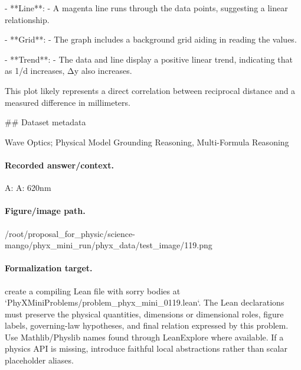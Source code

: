 - **Line**:
  - A magenta line runs through the data points, suggesting a linear relationship.
  
- **Grid**:
  - The graph includes a background grid aiding in reading the values.

- **Trend**:
  - The data and line display a positive linear trend, indicating that as 1/d increases, Δy also increases.

This plot likely represents a direct correlation between reciprocal distance and a measured difference in millimeters.

\#\# Dataset metadata

Wave Optics; Physical Model Grounding Reasoning, Multi-Formula Reasoning

\paragraph{Recorded answer/context.}
A: A: 620nm

\paragraph{Figure/image path.}
/root/proposal\_for\_physic/science-mango/phyx\_mini\_run/phyx\_data/test\_image/119.png

\paragraph{Formalization target.}
create a compiling Lean file with sorry bodies at `PhyXMiniProblems/problem\_phyx\_mini\_0119.lean`. The Lean declarations must preserve the physical quantities, dimensions or dimensional roles, figure labels, governing-law hypotheses, and final relation expressed by this problem.
Use Mathlib/Physlib names found through LeanExplore where available. If a physics API is missing, introduce faithful local abstractions rather than scalar placeholder aliases.

